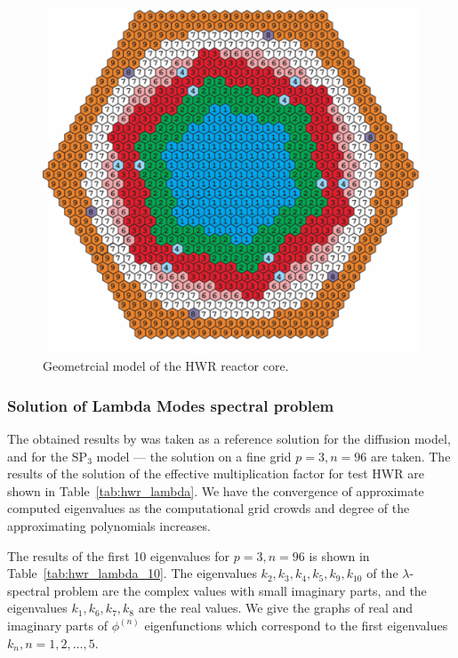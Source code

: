 \documentclass[authoryear]{elsarticle}
\begin{document}
\begin{figure}[hp]
	\begin{center}
    		\includegraphics[width=0.9\linewidth] {hwr.png}
		\caption{Geometrcial model of the HWR reactor core.}
		\label{fig:hwr}
	\end{center}
\end{figure} 

\subsubsection{Solution of Lambda Modes spectral problem}
The obtained results by \citep{chao1995} was taken as a reference solution for the diffusion model, and for the $\mathrm{SP_3}$ model ---  the solution on a fine grid $p = 3, n = 96 $ are taken.
The results of the solution of the effective multiplication factor for test HWR are shown in Table~\ref{tab:hwr_lambda}. 
We have the convergence of approximate computed eigenvalues as the computational grid crowds and degree of the approximating polynomials increases.

The results of the first 10 eigenvalues for $ p = 3, n = 96 $ is shown in Table~\ref{tab:hwr_lambda_10}.
The eigenvalues $k_2, k_3, k_4, k_5, k_9, k_{10}$ of the $\lambda$-spectral problem are the complex values with small imaginary parts, and the eigenvalues $k_1, k_6, k_7, k_8$ are the real values. 
We give the graphs of real and imaginary parts of $\phi^{(n)}$ eigenfunctions which correspond to the first eigenvalues $k_n, n = 1, 2, \dots, 5$. 
\end{document}
